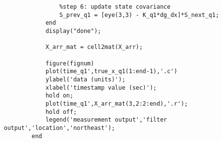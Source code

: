 \documentclass{article}
\begin{document}
\begin{verbatim}
		        %step 6: update state covariance
		        S_prev_q1 = [eye(3,3) - K_q1*dg_dx]*S_next_q1;
		    end
		    display("done");
		
		    X_arr_mat = cell2mat(X_arr);
		
		    figure(fignum)
		    plot(time_q1',true_x_q1(1:end-1),'.c')
		    ylabel('data (units)');
		    xlabel('timestamp value (sec)');
		    hold on;
		    plot(time_q1',X_arr_mat(3,2:2:end),'.r');
		    hold off;
		    legend('measurement output','filter output','location','northeast');
		end

	\end{verbatim}
\end{document}
